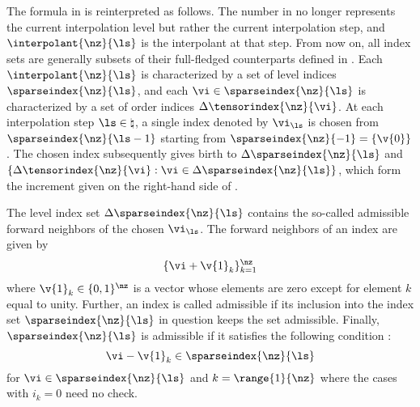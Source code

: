 The formula in  is reinterpreted as follows. The number
\ls in  no longer represents the current interpolation
level but rather the current interpolation step, and $\interpolant{\nz}{\ls}$ is
the interpolant at that step. From now on, all index sets are generally subsets
of their full-fledged counterparts defined in . Each
$\interpolant{\nz}{\ls}$ is characterized by a set of level indices
$\sparseindex{\nz}{\ls}$, and each $\vi \in \sparseindex{\nz}{\ls}$ is
characterized by a set of order indices $\Delta\tensorindex{\nz}{\vi}$. At each
interpolation step $\ls \in \natural$, a single index denoted by $\vi_{\ls}$ is
chosen from $\sparseindex{\nz}{\ls - 1}$ starting from $\sparseindex{\nz}{-1} =
\{ \v{0} \}$. The chosen index subsequently gives birth to
$\Delta\sparseindex{\nz}{\ls}$ and $\{ \Delta\tensorindex{\nz}{\vi}: \vi \in
\Delta\sparseindex{\nz}{\ls} \}$, which form the increment given on the
right-hand side of .

The level index set $\Delta\sparseindex{\nz}{\ls}$ contains the so-called
admissible forward neighbors of the chosen $\vi_{\ls}$. The forward neighbors of
an index \vi are given by
\[
  \{ \vi + \v{1}_k \}_{k = 1}^\nz
\]
where $\v{1}_k \in \{ 0, 1 \}^\nz$ is a vector whose elements are zero except
for element $k$ equal to unity. Further, an index \vi is called admissible if
its inclusion into the index set $\sparseindex{\nz}{\ls}$ in question keeps the
set admissible. Finally, $\sparseindex{\nz}{\ls}$ is admissible if it satisfies
the following condition \cite{klimke2006}:
\[
  \vi - \v{1}_k \in \sparseindex{\nz}{\ls}
\]
for $\vi \in \sparseindex{\nz}{\ls}$ and $k = \range{1}{\nz}$ where the cases
with $i_k = 0$ need no check.

